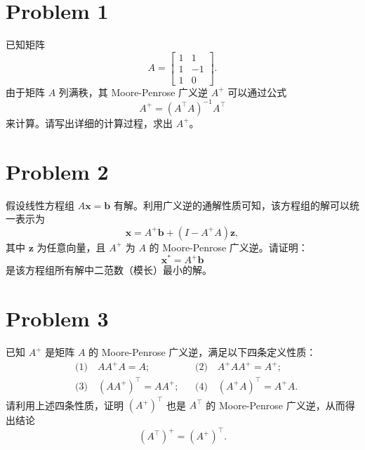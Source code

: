 \section*{Problem 1}

已知矩阵
\[
    A = \begin{bmatrix}
        1 & 1 \\
        1 & -1 \\
        1 & 0
    \end{bmatrix}.
\]
由于矩阵 $A$ 列满秩，其 Moore-Penrose 广义逆 $A^+$ 可以通过公式
\[
    A^+ = \left(A^\top A\right)^{-1}A^\top
\]
来计算。请写出详细的计算过程，求出 $A^+$。

\section*{Problem 2}

假设线性方程组 $A\bm{x} = \bm{b}$ 有解。利用广义逆的通解性质可知，该方程组的解可以统一表示为
\[
    \bm{x} = A^+\bm{b} + \left(I - A^+A\right)\bm{z},
\]
其中 $\bm{z}$ 为任意向量，且 $A^+$ 为 $A$ 的 Moore-Penrose 广义逆。请证明：
\[
    \bm{x}^* = A^+\bm{b}
\]
是该方程组所有解中二范数（模长）最小的解。

\section*{Problem 3}

已知 $A^+$ 是矩阵 $A$ 的 Moore-Penrose 广义逆，满足以下四条定义性质：
\[
    \begin{aligned}
        &\text{(1)}\quad AA^+A = A; &
        &\text{(2)}\quad A^+AA^+ = A^+; \\
        &\text{(3)}\quad \left(AA^+\right)^\top = AA^+; &
        &\text{(4)}\quad \left(A^+A\right)^\top = A^+A.
    \end{aligned}
\]
请利用上述四条性质，证明 $\left(A^+\right)^\top$ 也是 $A^\top$ 的 Moore-Penrose 广义逆，从而得出结论
\[
    \left(A^\top\right)^+ = \left(A^+\right)^\top.
\]
